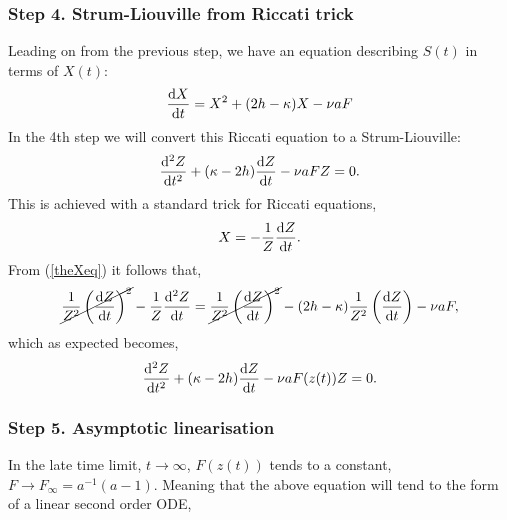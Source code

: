 \subsubsection{Step 4. Strum-Liouville from Riccati trick}
 Leading on from the previous step, we have an equation describing $S(t)$ in terms of $X(t)$:
 \begin{equation}
 \label{theXeq}
\displaystyle\frac{{\rm d} X}{{\rm d} t} = X^2 + (2h-\kappa)X - \nu a F
\end{equation}
In the 4th step we will convert this Riccati equation to a Strum-Liouville: 
$$\frac{{\rm d}^2 Z}{{\rm d} t^2} + (\kappa - 2h ) \displaystyle\frac{{\rm d} Z}{{\rm d} t} - \nu a F Z = 0. $$
This is achieved with a standard trick for Riccati equations, 
$$X = -\frac{1}{Z}\displaystyle\frac{{\rm d} Z}{{\rm d} t}.$$
From (\ref{theXeq}) it follows that,
$$\cancel{\frac{1}{Z^2}\left(\displaystyle\frac{{\rm d} Z}{{\rm d} t}\right)^2 } - \frac{1}{Z}\frac{{\rm d}^2 Z}{{\rm d} t}  =  \cancel{\frac{1}{Z^2}\left(\displaystyle\frac{{\rm d} Z}{{\rm d} t}\right)^2 } - (2h - \kappa) \frac{1}{Z^2}\left(\displaystyle\frac{{\rm d} Z}{{\rm d} t}\right)  - \nu a F ,$$
which as expected becomes, 
\begin{equation}
\label{StLio}
\frac{{\rm d}^2 Z}{{\rm d} t^2} + (\kappa - 2h ) \displaystyle\frac{{\rm d} Z}{{\rm d} t} - \nu a F(z(t)) Z = 0. 
\end{equation}


\subsubsection{Step 5. Asymptotic linearisation}

In the late time limit, $t\to\infty$, $F(z(t))$ tends to a constant, $F\to F_{\infty} =  a^{-1}(a-1)$. Meaning that the above equation will tend to the form of a linear second order ODE, 

